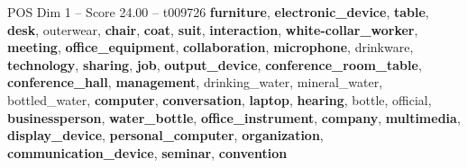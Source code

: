 \begin{textsample}{POS Dim 1 – Score 24.00 – t009726}  \label{ex:f1_pos_032}
\textbf{furniture}, \textbf{electronic\_device}, \textbf{table}, \textbf{desk}, outerwear, \textbf{chair}, \textbf{coat}, \textbf{suit}, \textbf{interaction}, \textbf{white-collar\_worker}, \textbf{meeting}, \textbf{office\_equipment}, \textbf{collaboration}, \textbf{microphone}, drinkware, \textbf{technology}, \textbf{sharing}, \textbf{job}, \textbf{output\_device}, \textbf{conference\_room\_table}, \textbf{conference\_hall}, \textbf{management}, drinking\_water, mineral\_water, bottled\_water, \textbf{computer}, \textbf{conversation}, \textbf{laptop}, \textbf{hearing}, bottle, official, \textbf{businessperson}, \textbf{water\_bottle}, \textbf{office\_instrument}, \textbf{company}, \textbf{multimedia}, \textbf{display\_device}, \textbf{personal\_computer}, \textbf{organization}, \textbf{communication\_device}, \textbf{seminar}, \textbf{convention}

\end{textsample}
